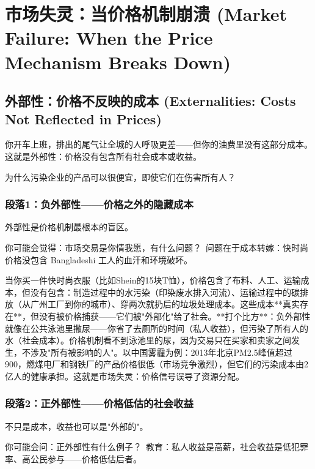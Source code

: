 \documentclass[openany, a4paper, 12pt]{book}
\newenvironment{motivation}{
	\vspace{0.5em}
	\begin{tcolorbox}[
		colback=gray!10,           %
		colframe=gray!60,          %
		title=\textit{本章动机 (Motivation)},
		fonttitle=\bfseries,
		arc=0mm,                   %
		leftrule=3mm               %
		]
		\small \itshape %
	}{
	\end{tcolorbox}
	\vspace{1em}
}
\begin{document}
\begin{motivation}
	\section{市场失灵：当价格机制崩溃 (Market Failure: When the Price Mechanism Breaks Down)}

	\subsection{外部性：价格不反映的成本 (Externalities: Costs Not Reflected in Prices)}
	\begin{motivation}
		你开车上班，排出的尾气让全城的人呼吸更差——但你的油费里没有这部分成本。这就是外部性：价格没有包含所有社会成本或收益。
	\end{motivation}
	\begin{questionbox}
		为什么污染企业的产品可以很便宜，即使它们在伤害所有人？
	\end{questionbox}

	\subsubsection*{段落1：负外部性——价格之外的隐藏成本}
	外部性是价格机制最根本的盲区。
	\begin{tcolorbox}[colback=yellow!5, title=\textit{读者行为预测}]
		你可能会觉得：市场交易是你情我愿，有什么问题？\ 问题在于成本转嫁：快时尚价格没包含 Bangladeshi 工人的血汗和环境破坏。
	\end{tcolorbox}

当你买一件快时尚衣服（比如Shein的15块T恤），价格包含了布料、人工、运输成本，但没有包含：制造过程中的水污染（印染废水排入河流）、运输过程中的碳排放（从广州工厂到你的城市）、穿两次就扔后的垃圾处理成本。这些成本**真实存在**，但没有被价格捕获——它们被"外部化"给了社会。**打个比方**：负外部性就像在公共泳池里撒尿——你省了去厕所的时间（私人收益），但污染了所有人的水（社会成本）。价格机制看不到泳池里的尿，因为交易只在买家和卖家之间发生，不涉及"所有被影响的人"。以中国雾霾为例：2013年北京PM2.5峰值超过900，燃煤电厂和钢铁厂的产品价格很低（市场竞争激烈），但它们的污染成本由2亿人的健康承担。这就是市场失灵：价格信号误导了资源分配。

	\subsubsection*{段落2：正外部性——价格低估的社会收益}
	不只是成本，收益也可以是"外部的"。
	\begin{tcolorbox}[colback=yellow!5, title=\textit{读者行为预测}]
		你可能会问：正外部性有什么例子？\ 教育：私人收益是高薪，社会收益是低犯罪率、高公民参与——价格低估后者。
	\end{tcolorbox}


\end{motivation}
\end{document}
